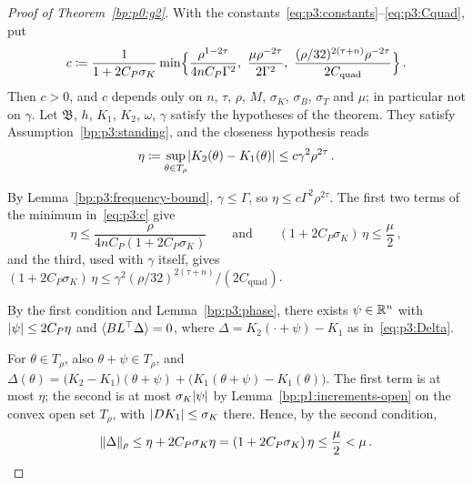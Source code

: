 \begin{proof}[Proof of Theorem~\ref{bp:p0:g2}]
\label{step:p3:g2-constant}
With the constants~\eqref{eq:p3:constants}--\eqref{eq:p3:Cquad}, put
\begin{equation}\label{eq:p3:c}
c\coloneqq\frac{1}{1+2C_P\sigma_K}\min\Bigl\{\frac{\rho^{1-2\tau}}{4nC_P\Gamma^2},\
\frac{\mu\rho^{-2\tau}}{2\Gamma^2},\ \frac{(\rho/32)^{2(\tau+n)}\rho^{-2\tau}}{2C_{\mathrm{quad}}}\Bigr\}\,.
\end{equation}
Then $c>0$, and $c$ depends only on $n$, $\tau$, $\rho$, $M$, $\sigma_K$, $\sigma_B$, $\sigma_T$ and $\mu$; in particular not on
$\gamma$. Let $\mathfrak B$, $h$, $K_1$, $K_2$, $\omega$, $\gamma$ satisfy the hypotheses of the theorem. They satisfy
Assumption~\ref{bp:p3:standing}, and the closeness hypothesis reads
\begin{equation*}
\eta\coloneqq\sup_{\theta\in T_\rho}\lvert K_2(\theta)-K_1(\theta)\rvert\le c\gamma^2\rho^{2\tau}\,.
\end{equation*}

\label{step:p3:g2-smallness}
By Lemma~\ref{bp:p3:frequency-bound}, $\gamma\le\Gamma$, so $\eta\le c\Gamma^2\rho^{2\tau}$. The first
two terms of the minimum in~\eqref{eq:p3:c} give
\begin{equation*}
\eta\le\frac{\rho}{4nC_P(1+2C_P\sigma_K)}\qquad\text{and}\qquad(1+2C_P\sigma_K)\,\eta\le\frac\mu2\,,
\end{equation*}
and the third, used with $\gamma$ itself, gives
$(1+2C_P\sigma_K)\,\eta\le\gamma^2(\rho/32)^{2(\tau+n)}/(2C_{\mathrm{quad}})$.

\label{step:p3:g2-phase}
By the first condition and Lemma~\ref{bp:p3:phase}, there exists $\psi\in\mathbb{R}^n$ with
$\lvert \psi\rvert\le2C_P\eta$ and $\langle BL^\top\Delta\rangle=0$, where $\Delta=K_2(\cdot+\psi)-K_1$ as
in~\eqref{eq:p3:Delta}.

\label{step:p3:g2-size}
For $\theta\in T_\rho$, also $\theta+\psi\in T_\rho$, and
$\Delta(\theta)=\bigl(K_2-K_1\bigr)(\theta+\psi)+\bigl(K_1(\theta+\psi)-K_1(\theta)\bigr)$. The first
term is at most $\eta$; the second is at most $\sigma_K\lvert \psi\rvert$ by Lemma~\ref{bp:p1:increments-open} on the convex open set
$T_\rho$, with $\lvert DK_1\rvert\le\sigma_K$ there. Hence, by the second condition,
\begin{equation*}
\lVert \Delta\rVert_\rho\le\eta+2C_P\sigma_K\eta=(1+2C_P\sigma_K)\,\eta\le\frac\mu2<\mu\,.
\end{equation*}


\end{proof}
